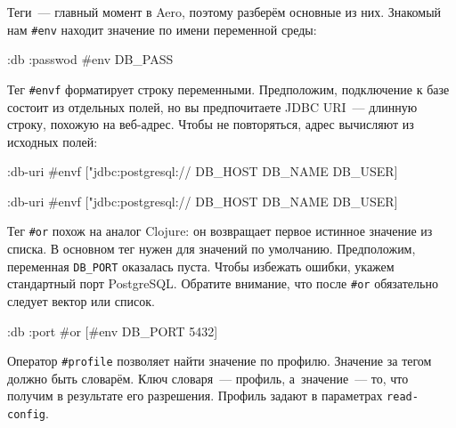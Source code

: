 Теги~--- главный момент в Aero, поэтому разберём основные из них. Знакомый нам
\verb|#env| находит значение по имени переменной среды:

\begin{english}
  \begin{clojure}
{:db {:passwod #env DB_PASS}}
  \end{clojure}
\end{english}

Тег \verb|#envf| форматирует строку переменными. Предположим, подключение к базе
состоит из отдельных полей, но вы предпочитаете JDBC URI~--- длинную строку,
похожую на веб-адрес. Чтобы не повторяться, адрес вычисляют из исходных полей:

\ifnarrow

\begin{english}
  \begin{clojure}
{:db-uri
 #envf ["jdbc:postgresql://%
        DB_HOST DB_NAME DB_USER]}
  \end{clojure}
\end{english}

\else

\begin{english}
  \begin{clojure}
{:db-uri #envf ["jdbc:postgresql://%
                DB_HOST DB_NAME DB_USER]}
  \end{clojure}
\end{english}

\fi

Тег \verb|#or| похож на аналог Clojure: он возвращает первое истинное значение
из списка. В основном тег нужен для значений по умолчанию. Предположим,
переменная \verb|DB_PORT| оказалась пуста. Чтобы избежать ошибки, укажем
стандартный порт PostgreSQL. Обратите внимание, что после \verb|#or| обязательно
следует вектор или список.

\begin{english}
  \begin{clojure}
{:db {:port #or [#env DB_PORT 5432]}}
  \end{clojure}
\end{english}


Оператор \verb|#profile| позволяет найти значение по профилю. Значение за тегом
должно быть словарём. Ключ словаря~--- профиль, а~значение~--- то, что получим в
результате его разрешения. Профиль задают в параметрах \verb|read-config|.

